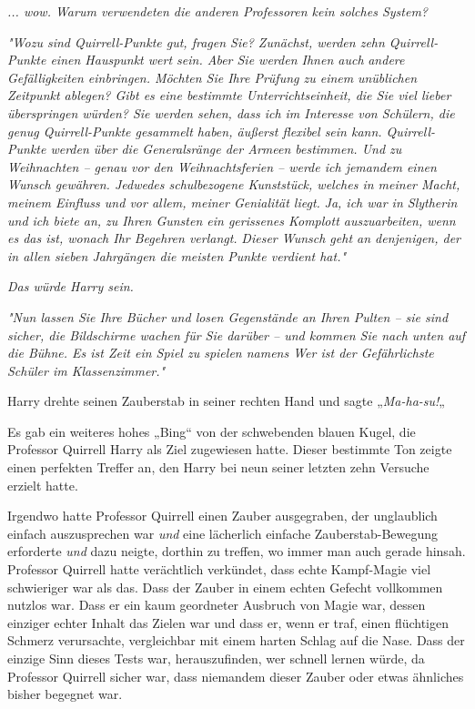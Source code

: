 {\emph{... wow. Warum verwendeten die anderen Professoren kein solches System?}

\emph{"Wozu sind Quirrell-Punkte gut, fragen Sie? Zunächst, werden zehn Quirrell-Punkte einen Hauspunkt wert sein. Aber Sie werden Ihnen auch} \emph{andere Gefälligkeiten einbringen. Möchten Sie Ihre Prüfung zu einem} \emph{unüblichen Zeitpunkt ablegen? Gibt es eine bestimmte Unterrichtseinheit, die Sie viel lieber überspringen würden? Sie werden sehen, dass ich im Interesse von Schülern, die genug Quirrell-Punkte gesammelt haben, äußerst flexibel sein kann. Quirrell-Punkte werden über die Generalsränge der Armeen bestimmen. Und zu Weihnachten -- genau vor den Weihnachtsferien -- werde ich jemandem einen Wunsch gewähren. Jedwedes schulbezogene Kunststück, welches in meiner Macht, meinem Einfluss und vor allem, meiner Genialität liegt.} \emph{Ja, ich war in Slytherin und ich biete an, zu Ihren Gunsten ein gerissenes Komplott auszuarbeiten, wenn es das ist, wonach Ihr Begehren verlangt.} \emph{Dieser Wunsch geht an denjenigen, der in allen sieben Jahrgängen die meisten Punkte verdient hat."}

\emph{Das würde Harry sein.}

\emph{"Nun lassen Sie Ihre Bücher und losen Gegenstände an Ihren Pulten -- sie sind sicher, die Bildschirme wachen für Sie darüber -- und kommen Sie nach unten auf die Bühne. Es ist Zeit ein Spiel zu spielen namens Wer ist der Gefährlichste Schüler im Klassenzimmer."}

Harry drehte seinen Zauberstab in seiner rechten Hand und sagte „\emph{Ma-ha-su!}„

Es gab ein weiteres hohes „Bing“ von der schwebenden blauen Kugel, die Professor Quirrell Harry als Ziel zugewiesen hatte. Dieser bestimmte Ton zeigte einen perfekten Treffer an, den Harry bei neun seiner letzten zehn Versuche erzielt hatte.

Irgendwo hatte Professor Quirrell einen Zauber ausgegraben, der unglaublich einfach auszusprechen war \emph{und} eine lächerlich einfache Zauberstab-Bewegung erforderte \emph{und} dazu neigte, dorthin zu treffen, wo immer man auch gerade hinsah. Professor Quirrell hatte verächtlich verkündet, dass echte Kampf-Magie viel schwieriger war als das. Dass der Zauber in einem echten Gefecht vollkommen nutzlos war. Dass er ein kaum geordneter Ausbruch von Magie war, dessen einziger echter Inhalt das Zielen war und dass er, wenn er traf, einen flüchtigen Schmerz verursachte, vergleichbar mit einem harten Schlag auf die Nase. Dass der einzige Sinn dieses Tests war, herauszufinden, wer schnell lernen würde, da Professor Quirrell sicher war, dass niemandem dieser Zauber oder etwas ähnliches bisher begegnet war.

}
